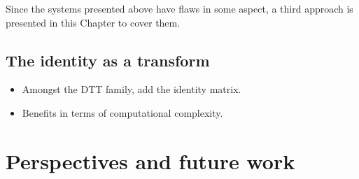 \documentclass[11pt,a4paper,openright,twoside]{book}
\numberwithin{equation}{section} %
\numberwithin{figure}{section} %
\numberwithin{table}{section} %
\begin{document}
Since the systems presented above have flaws in some aspect, a third approach
is presented in this Chapter to cover them.

\section{The identity as a transform}
\label{sec:the_identity_as_a_transform}

\begin{itemize}
	\item Amongst the \ac{DTT} family, add the identity matrix.
	\item Benefits in terms of computational complexity.
\end{itemize}

\chapter{Perspectives and future work}
\label{cha:perspectives_and_future_work}

\backmatter



\label{cha:index}
\printindex
{}
\thispagestyle{empty}
\end{document}
